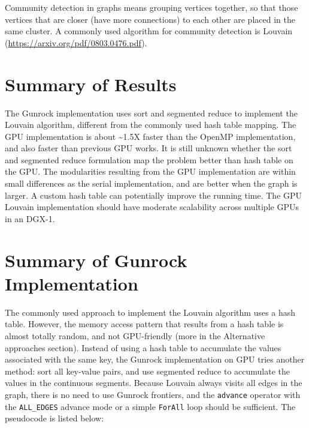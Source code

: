 \documentclass[10pt,oneside]{memoir}
\begin{document}
Community detection in graphs means grouping vertices together, so that
those vertices that are closer (have more connections) to each other are
placed in the same cluster. A commonly used algorithm for community
detection is Louvain (\url{https://arxiv.org/pdf/0803.0476.pdf}).

\hypertarget{summary-of-results-4}{%
\section{Summary of Results}\label{summary-of-results-4}}

The Gunrock implementation uses sort and segmented reduce to implement
the Louvain algorithm, different from the commonly used hash table
mapping. The GPU implementation is about \textasciitilde{}1.5X faster
than the OpenMP implementation, and also faster than previous GPU works.
It is still unknown whether the sort and segmented reduce formulation
map the problem better than hash table on the GPU. The modularities
resulting from the GPU implementation are within small differences as
the serial implementation, and are better when the graph is larger. A
custom hash table can potentially improve the running time. The GPU
Louvain implementation should have moderate scalability across multiple
GPUs in an DGX-1.

\hypertarget{summary-of-gunrock-implementation-3}{%
\section{Summary of Gunrock
Implementation}\label{summary-of-gunrock-implementation-3}}

The commonly used approach to implement the Louvain algorithm uses a
hash table. However, the memory access pattern that results from a hash
table is almost totally random, and not GPU-friendly (more in the
Alternative approaches section). Instead of using a hash table to
accumulate the values associated with the same key, the Gunrock
implementation on GPU tries another method: sort all key-value pairs,
and use segmented reduce to accumulate the values in the continuous
segments. Because Louvain always visits all edges in the graph, there is
no need to use Gunrock frontiers, and the \texttt{advance} operator with
the \texttt{ALL\_EDGES} advance mode or a simple \texttt{ForAll} loop
should be sufficient. The pseudocode is listed below:
\end{document}
